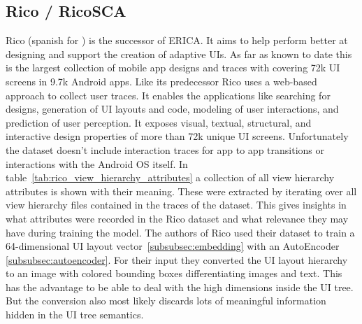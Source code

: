 

\subsection{Rico / RicoSCA}
\label{subsec:rico}

Rico \cite{deka2017rico} (spanish for ) is the successor of ERICA.
It aims to help perform better at designing and support the creation of adaptive UIs.
As far as known to date this is the largest collection of mobile app designs and traces with covering 72k UI screens in 9.7k Android apps.
Like its predecessor Rico uses a web-based approach to collect user traces.
It enables the applications like searching for designs, generation of UI layouts and code, modeling of user interactions, and prediction of user perception.
It exposes visual, textual, structural, and interactive design properties of more than 72k unique UI screens.
Unfortunately the dataset doesn't include interaction traces for app to app transitions or interactions with the Android OS itself.
In table~\ref{tab:rico_view_hierarchy_attributes} a collection of all view hierarchy attributes is shown with their meaning.
These were extracted by iterating over all view hierarchy files contained in the traces of the dataset.
This gives insights in what attributes were recorded in the Rico dataset and what relevance they may have during training the model.
The authors of Rico used their dataset to train a 64-dimensional UI layout vector~\ref{subsubsec:embedding} with an AutoEncoder \ref{subsubsec:autoencoder}.
For their input they converted the UI layout hierarchy to an image with colored bounding boxes differentiating images and text.
This has the advantage to be able to deal with the high dimensions inside the UI tree.
But the conversion also most likely discards lots of meaningful information hidden in the UI tree semantics.

